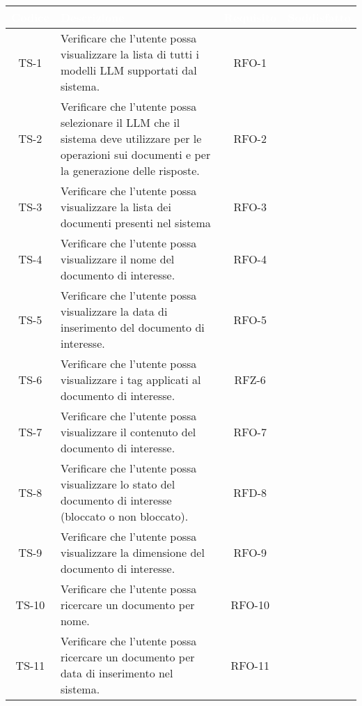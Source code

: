 \begingroup
\setlength{\tabcolsep}{10pt}
\renewcommand{\arraystretch}{1.5}
\begin{xltabular}{\textwidth}{| c | X | c | c |}
    \hline
     \textbf{\textcolor{white}{Codice}} & \textbf{\textcolor{white}{Descrizione}} & \textbf{\textcolor{white}{Requisito}} & \textbf{\textcolor{white}{Soddisfatto}}\\
    \hline
    \endhead
    TS-1 & Verificare che l’utente possa visualizzare la lista di tutti i modelli LLM supportati dal sistema. & RFO-1 & \textcolor{xmarkcolor}{} \\
    \hline
    TS-2 & Verificare che l’utente possa selezionare il LLM che il sistema deve utilizzare per le operazioni sui documenti e per la generazione delle risposte. & RFO-2 & \textcolor{xmarkcolor}{} \\
    \hline
    TS-3 & Verificare che l'utente possa visualizzare la lista dei documenti presenti nel sistema & RFO-3 & \textcolor{xmarkcolor}{} \\
    \hline
    TS-4 & Verificare che l’utente possa visualizzare il nome del documento di interesse. & RFO-4 & \textcolor{xmarkcolor}{} \\
    \hline
    TS-5 & Verificare che l’utente possa visualizzare la data di inserimento del documento di interesse. & RFO-5 & \textcolor{xmarkcolor}{} \\
    \hline
    TS-6 & Verificare che l’utente possa visualizzare i tag applicati al documento di interesse. & RFZ-6 & \textcolor{xmarkcolor}{} \\
    \hline
    TS-7 & Verificare che l’utente possa visualizzare il contenuto del documento di interesse. & RFO-7 & \textcolor{xmarkcolor}{} \\
    \hline
    TS-8 & Verificare che l’utente possa visualizzare lo stato del documento di interesse (bloccato o non bloccato). & RFD-8 & \textcolor{xmarkcolor}{} \\
    \hline
    TS-9 &  Verificare che l’utente possa visualizzare la dimensione del documento di interesse. & RFO-9 & \textcolor{xmarkcolor}{} \\
    \hline
    TS-10 & Verificare che l’utente possa ricercare un documento per nome. & RFO-10 & \textcolor{xmarkcolor}{} \\
    \hline
    TS-11 & Verificare che l’utente possa ricercare un documento per data di inserimento nel sistema. & RFO-11 & \textcolor{xmarkcolor}{} \\

\end{xltabular}
